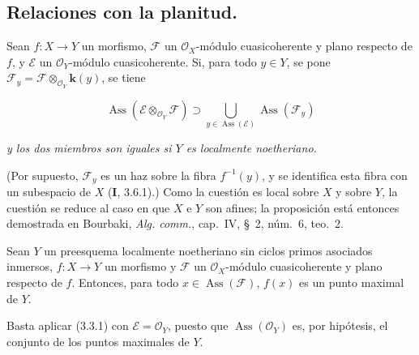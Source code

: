 \subsection{Relaciones con la planitud.}

\begin{proposition}[3.3.1]
Sean $f:X\to Y$ un morfismo, $\mathcal F$ un $\mathcal O_X$-módulo
cuasicoherente y plano respecto de $f$, y $\mathcal E$ un
$\mathcal O_Y$-módulo cuasicoherente. Si, para todo $y\in Y$, se pone
$\mathcal F_y=\mathcal F\otimes_{\mathcal O_Y}\boldsymbol{k}(y)$, se tiene
\end{proposition}

\begin{env}[3.3.1.1]
\label{IV.2.3.3.1.1-fr}
\[
\operatorname{Ass}(\mathcal E\otimes_{\mathcal O_Y}\mathcal F)
\supset\bigcup_{y\in\operatorname{Ass}(\mathcal E)}
\operatorname{Ass}(\mathcal F_y)
\]
\end{env}

\emph{y los dos miembros son iguales si $Y$ es localmente noetheriano.}

(Por supuesto, $\mathcal F_y$ es un haz sobre la fibra $f^{-1}(y)$, y se
identifica esta fibra con un subespacio de $X$ (\textbf I, 3.6.1).) Como la cuestión es
local sobre $X$ y sobre $Y$, la cuestión se reduce al caso en que $X$ e $Y$ son
afines; la proposición está entonces demostrada en Bourbaki,
\emph{Alg. comm.}, cap.~IV, \S~2, núm.~6, teo.~2.

\begin{corollary}[3.3.2]
\label{IV.2.3.3.2-fr}
Sean $Y$ un preesquema localmente noetheriano sin ciclos primos asociados
inmersos, $f:X\to Y$ un morfismo y $\mathcal F$ un $\mathcal O_X$-módulo
cuasicoherente y plano respecto de $f$. Entonces, para todo
$x\in\operatorname{Ass}(\mathcal F)$, $f(x)$ es un punto maximal de $Y$.
\end{corollary}

Basta aplicar (3.3.1) con $\mathcal E=\mathcal O_Y$, puesto que
$\operatorname{Ass}(\mathcal O_Y)$ es, por hipótesis, el conjunto de los
puntos maximales de $Y$.

